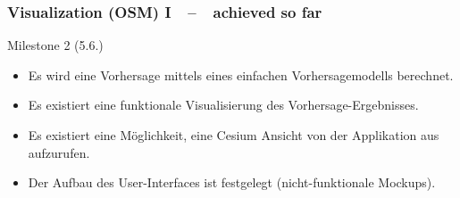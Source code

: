 \documentclass[xcolor=dvipsnames]{beamer}
\begin{document}
\begin{frame}
	\frametitle{\textbf{Visualization (OSM) I}~~--~~achieved so far}
	\large{Milestone 2 (5.6.)}
	\normalsize
	\begin{itemize} 
		\item \color{LightGray}Es wird eine Vorhersage mittels eines einfachen Vorhersagemodells berechnet.
		\item \color{Green}Es existiert eine funktionale Visualisierung des Vorhersage-Ergebnisses.
		\item \color{LightGray}Es existiert eine Möglichkeit, eine Cesium Ansicht von der Applikation aus aufzurufen.
		\item \color{LightGray}Der Aufbau des User-Interfaces ist festgelegt (nicht-funktionale Mockups).
	\end{itemize}
\end{frame}
\end{document}
